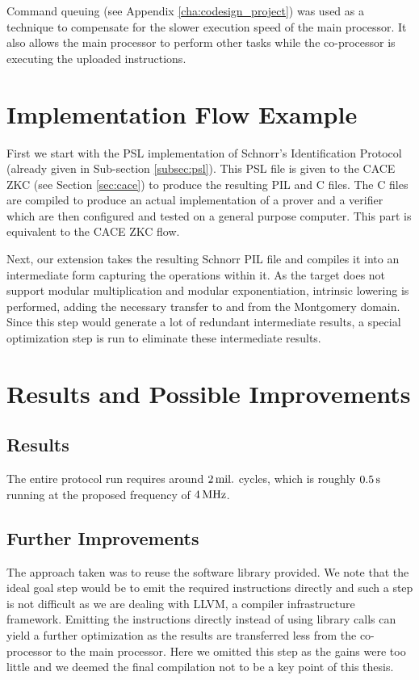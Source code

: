 Command queuing (see Appendix \ref{cha:codesign_project}) was used as
a technique to compensate for the slower execution speed of the main
processor. It also allows the main processor to perform other tasks
while the co-processor is executing the uploaded instructions.

\section{Implementation Flow Example}
\label{sec:usecase_flow}

First we start with the PSL implementation of Schnorr's Identification
Protocol (already given in Sub-section \ref{subsec:psl}). This PSL
file is given to the CACE ZKC (see Section \ref{sec:cace}) to produce
the resulting PIL and C files. The C files are compiled to produce an
actual implementation of a prover and a verifier which are then
configured and tested on a general purpose computer. This part is
equivalent to the CACE ZKC flow.

Next, our extension takes the resulting Schnorr PIL file and compiles
it into an intermediate form capturing the operations within it. As
the target does not support modular multiplication and modular
exponentiation, intrinsic lowering is performed, adding the necessary
transfer to and from the Montgomery domain. Since this step would
generate a lot of redundant intermediate results, a special
optimization step is run to eliminate these intermediate results.

\section{Results and Possible Improvements}
\label{sec:usecase_results}

\subsection{Results}

The entire protocol run requires around $\unit[2]{mil.}$ cycles, which
is roughly $\unit[0.5]{s}$ running at the proposed frequency of
$\unit[4]{MHz}$.

\subsection{Further Improvements}

The approach taken was to reuse the software library provided. We note
that the ideal goal step would be to emit the required instructions
directly and such a step is not difficult as we are dealing with LLVM,
a compiler infrastructure framework. Emitting the instructions
directly instead of using library calls can yield a further
optimization as the results are transferred less from the co-processor
to the main processor. Here we omitted this step as the gains were too
little and we deemed the final compilation not to be a key point of
this thesis.

